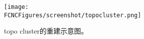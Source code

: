 \begin{figure}[htb]
\centering
\texttt{[image: \\FCNCFigures/screenshot/topocluster.png]}
\caption{topo cluster的重建示意图。}
\label{fig:topocluster}
\end{figure}